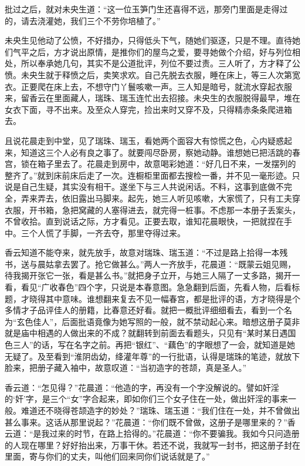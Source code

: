\documentclass[a4paper,12pt,UTF8,twoside]{ctexbook}
\begin{document}
批过之后，就对未央生道：“这一位玉笋门生还喜得不远，那旁门里面是走得过的，请去浇灌她，我们三个不劳你培植了。”

未央生见他动了公愤，不好措办，只得低头下气，随她们驱逐，只是不理。直待她们气平之后，方才说出原情，是推你们的屋鸟之爱，要寻她做个介绍，好与列位相处，所以奉承她几句，其实不是公道批评，列位不要过责。三人听了，方才释了公愤。未央生就于释愤之后，卖笑求欢。自己先脱去衣服，睡在床上，等三人次第宽衣。正要爬在床上去，不想守门丫鬟咳嗽一声。三人知是暗号，就流水穿起衣服来，留香云在里面藏人，瑞珠、瑞玉连忙出去招接。未央生的衣服脱得最早，堆在女衣下面，寻不出来。及至众人穿完，捡出来时又穿不及，只得精赤条条爬进箱去。

且说花晨走到中堂，见了瑞珠、瑞玉，看她两个面容大有惊慌之色，心内疑惑起来，知道这三个人必有良之事了。就要闯尽卧房，察她动静。谁想她已把活跳的春宫，锁在箱子里去了。花晨走到房中，故意喝彩她道：“好几日不来，一发摆列的整齐了。”就到床前床后走了一次。连橱柜里面都去搜检一番，并不见一毫形迹。只说是自己生疑，其实没有相干。遂坐下与三人共说闲话。不料，这事到底做不完全，弄来弄去，依旧露出马脚来。起先，她三人听见咳嗽，大家慌了，只有工夫穿衣服，开书箱，急把窝藏的人塞得进去，就完得一桩事。不虑那一本册子丢案头，不曾收拾。直到说话之际，方才看见。正要去取，谁知花晨眼快，一把就捏在手中。三个人慌了手脚，一齐去夺，那里夺得过来。

香云知道不能夺来，就先放手，故意对瑞珠、瑞玉道：“不过是路上拾得一本残书，送与晨姑拿去罢了。抢它做甚么。”两人一齐放手，花晨道：“既蒙云姐见赐，待我揭开张它一张，看是甚么书。”就把身子立开，与她三人隔了一丈多路，揭开一看，看见“广收春色”四个字，只说是本春意图。急急翻到后面，先看人物，后看标题，才晓得其中意味。谁想翻来复去不见一幅春宫，都是批评的语，方才晓得是个多情才子品评佳人的册籍，比春意还好看。就把一概批评细细看去，看到一个名为“玄色佳人”，后面批语竟像为她写照的一般，就不禁动起心来。暗想这册子莫非就是庙中相遇的人做出来的不成？就翻转到前面去看题头，只见有“某时某日遇国色三人”的话，写在名字之前。再把“银红”、“藕色”的字眼想了一会，就知道是她无疑了。及至看到“淮阴齿幼，绛灌年尊”的一行批语，认得是瑞珠的笔迹，就放下脸来，把册子藏入袖中，故意叹道：“当初造字的苍颉，真是圣人。”

香云道：“怎见得？”花晨道：“他造的字，再没有一个字没解说的。譬如奸淫的‘奸’字，是三个“女”字合起来，即如你们三个女子住在一处，做出奸淫的事来一般。难道还不晓得苍颉造字的妙处？”瑞珠、瑞玉道：“我们住在一处，并不曾做出甚么事来。这话从那里说起？”花晨道：“你们既不曾做，这册子是哪里来的？”香云道：“是我过来的时节，在路上拾得的。”花晨道：“你不要骗我。我如今只问造册的人现在哪里？好好抬出来，万事干休。若还不说，我就写一封书，把这册子封在里面，寄与你们的丈夫，叫他们回来同你们说话就是了。”
\end{document}
